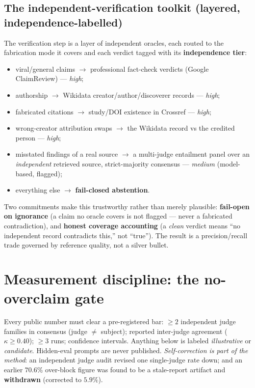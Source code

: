 \documentclass[11pt]{article}
\begin{document}
\subsection{The independent-verification toolkit (layered, independence-labelled)}
The verification step is a layer of independent oracles, each routed to the fabrication mode it
covers and each verdict tagged with its \textbf{independence tier}:
\begin{itemize}
  \item viral/general claims $\rightarrow$ professional fact-check verdicts (Google ClaimReview) --- \emph{high};
  \item authorship $\rightarrow$ Wikidata creator/author/discoverer records --- \emph{high};
  \item fabricated citations $\rightarrow$ study/DOI existence in Crossref --- \emph{high};
  \item wrong-creator attribution swaps $\rightarrow$ the Wikidata record vs the credited person --- \emph{high};
  \item misstated findings of a real source $\rightarrow$ a multi-judge entailment panel over an
        \emph{independent} retrieved source, strict-majority consensus --- \emph{medium} (model-based, flagged);
  \item everything else $\rightarrow$ \textbf{fail-closed abstention}.
\end{itemize}
Two commitments make this trustworthy rather than merely plausible: \textbf{fail-open on
ignorance} (a claim no oracle covers is not flagged --- never a fabricated contradiction), and
\textbf{honest coverage accounting} (a \emph{clean} verdict means ``no independent record
contradicts this,'' not ``true''). The result is a precision/recall trade governed by reference
quality, not a silver bullet.

\section{Measurement discipline: the no-overclaim gate}
Every public number must clear a pre-registered bar: $\ge 2$ independent judge families in
consensus (judge $\ne$ subject); reported inter-judge agreement ($\kappa \ge 0.40$); $\ge 3$ runs;
confidence intervals. Anything below is labeled \emph{illustrative} or \emph{candidate}.
Hidden-eval prompts are never published. \emph{Self-correction is part of the method}: an
independent judge audit revised one single-judge rate down; and an earlier $70.6\%$ over-block
figure was found to be a stale-report artifact and \textbf{withdrawn} (corrected to $5.9\%$).
\end{document}
